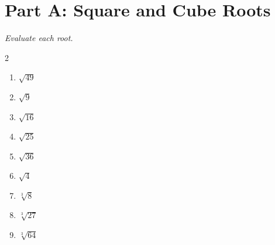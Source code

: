 \documentclass[11pt]{article}
\begin{document}
\section*{Part A: Square and Cube Roots}
\noindent\textit{Evaluate each root.}
\begin{multicols}{2}
\begin{enumerate}
  \item $\sqrt{49}$
  \vspace{1.1cm}
  \item $\sqrt{9}$
  \vspace{1.1cm}
  \item $\sqrt{16}$
  \vspace{1.1cm}
  \item $\sqrt{25}$
  \vspace{1.1cm}
  \item $\sqrt{36}$
  \vspace{1.1cm}
  \item $\sqrt{4}$
  \vspace{1.1cm}
  \item $\sqrt[3]{8}$
  \vspace{1.1cm}
  \item $\sqrt[3]{27}$
  \vspace{1.1cm}
  \item $\sqrt[3]{64}$
  \vspace{1.1cm}
\end{enumerate}
\end{multicols}
\end{document}
